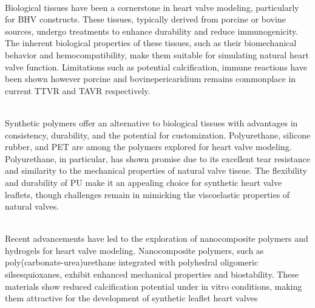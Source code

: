 \\
Biological tissues have been a cornerstone in heart valve modeling, particularly for \gls{BHV} constructs. These tissues, typically derived from porcine or bovine sources, undergo treatments to enhance durability and reduce immunogenicity. The inherent biological properties of these tissues, such as their biomechanical behavior and hemocompatibility, make them suitable for simulating natural heart valve function. Limitations such as potential calcification, immune reactions have been shown however porcine and bovinepericaridium remains commonplace in current \gls{TTVR} and \gls{TAVR} respectively. ~

\\
Synthetic polymers offer an alternative to biological tissues with advantages in consistency, durability, and the potential for customization. Polyurethane, silicone rubber, and \gls{PET} are among the polymers explored for heart valve modeling. Polyurethane, in particular, has shown promise due to its excellent tear resistance and similarity to the mechanical properties of natural valve tissue. The flexibility and durability of \gls{PU} make it an appealing choice for synthetic heart valve leaflets, though challenges remain in mimicking the viscoelastic properties of natural valves. ~ 

\\
Recent advancements have led to the exploration of nanocomposite polymers and hydrogels for heart valve modeling. Nanocomposite polymers, such as poly(carbonate-urea)urethane integrated with polyhedral oligomeric silsesquioxanes, exhibit enhanced mechanical properties and biostability. These materials show reduced calcification potential under in vitro conditions, making them attractive for the development of synthetic leaflet heart valves ~


